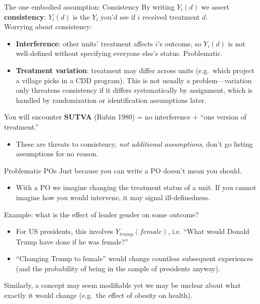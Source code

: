 \documentclass[xcolor=dvipsnames]{beamer}
\begin{document}
\begin{frame}{The one embodied assumption: Consistency}
\small
{} By writing $Y_i(d)$ we assert \textbf{consistency}: $Y_i(d)$ is the $Y_i$ you'd see if $i$ received treatment $d$.\\
\medskip
{} Worrying about consistency:
\footnotesize
\begin{itemize}
\item<3-> \textbf{Interference}: other units' treatment affects $i$'s outcome, so $Y_i(d)$ is not well-defined without specifying everyone else's status. Problematic. 
\medskip
\item<4-> \textbf{Treatment variation}: treatment may differ across units (e.g.\ which project a village picks in a CDD program). This is not usually a problem---variation only threatens consistency if it differs systematically by assignment, which is handled by randomization or identification assumptions later.
\end{itemize}
\small
{} You will encounter \textbf{SUTVA} (Rubin 1980) = no interference + ``one version of treatment.''\\
\begin{itemize}
\item These are threats to consistency, \textit{not additional assumptions}, don't go listing assumptions for no reason.
\end{itemize}
\end{frame}

\begin{frame}{Problematic POs}
 Just because you can write a PO doesn't mean you should.\\
\footnotesize
\begin{itemize}
\item<2-> With a PO we imagine changing the treatment status of a unit. If you cannot imagine how you would intervene, it may signal ill-definedness.
\end{itemize}
\small
{} Example: what is the effect of leader gender on some outcome? \\
\footnotesize
\begin{itemize}
\item<3-> For US presidents, this involves $Y_{trump}(female)$, i.e. ``What would Donald Trump have done if he was female?''
\item<4-> ``Changing Trump to female'' would change countless subsequent experiences (and the probability of being in the sample of presidents anyway).
\end{itemize}
\small
{} Similarly, a concept may seem modifiable yet we may be unclear about what exactly it would change (e.g.\ the effect of obesity on health).
\end{frame}
\end{document}
